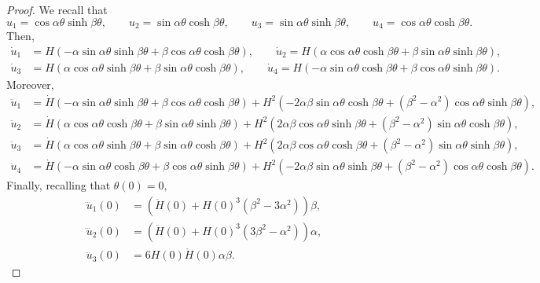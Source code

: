 \documentclass[11pt]{amsart}
\theoremstyle{definition}
\theoremstyle{remark}
\numberwithin{equation}{section}
\begin{document}
\begin{proof}
We recall that
\begin{equation*}
u_1=\cos \alpha\theta\sinh\beta\theta,\qquad
u_2=\sin \alpha\theta\cosh\beta\theta,\qquad
u_3= \sin \alpha\theta\sinh\beta\theta,\qquad
u_4=\cos \alpha\theta\cosh\beta\theta.
\end{equation*}
Then,
\begin{align*}
\dot u_1&=H\left(-\alpha\sin\alpha\theta\sinh\beta\theta+\beta\cos\alpha\theta\cosh\beta\theta\right),\qquad\dot u_2=H\left(\alpha\cos\alpha\theta\cosh\beta\theta+\beta\sin\alpha\theta\sinh\beta\theta\right),\\
\dot u_3&=H\left(\alpha\cos\alpha\theta\sinh\beta\theta+\beta\sin\alpha\theta\cosh\beta\theta\right),\qquad\dot u_4=H\left(-\alpha\sin\alpha\theta\cosh\beta\theta+\beta\cos\alpha\theta\sinh\beta\theta\right).
\end{align*}
Moreover,
\begin{align*}
\ddot u_1&=\dot H\left(-\alpha\sin\alpha\theta\sinh\beta\theta+\beta\cos\alpha\theta\cosh\beta\theta\right)+H^2\left(-2\alpha\beta\sin\alpha\theta\cosh\beta\theta+\left(\beta^2-\alpha^2\right)\cos\alpha\theta\sinh\beta\theta\right),\\
\ddot u_2&=\dot H\left(\alpha\cos\alpha\theta\cosh\beta\theta+\beta\sin\alpha\theta\sinh\beta\theta\right)+H^2\left(2\alpha\beta\cos\alpha\theta\sinh\beta\theta+\left(\beta^2-\alpha^2\right)\sin\alpha\theta\cosh\beta\theta\right),\\
\ddot u_3&=\dot H\left(\alpha\cos\alpha\theta\sinh\beta\theta+\beta\sin\alpha\theta\cosh\beta\theta\right)+H^2\left(2\alpha\beta\cos\alpha\theta\cosh\beta\theta+\left(\beta^2-\alpha^2\right)\sin\alpha\theta\sinh\beta\theta\right),\\
\ddot u_4&=\dot H\left(-\alpha\sin\alpha\theta\cosh\beta\theta+\beta\cos\alpha\theta\sinh\beta\theta\right)+H^2\left(-2\alpha\beta\sin\alpha\theta\sinh\beta\theta+\left(\beta^2-\alpha^2\right)\cos\alpha\theta\cosh\beta\theta\right).
\end{align*}
Finally, recalling that $\theta(0)=0,$
\begin{align*}
\dddot u_1(0)&=\left(\ddot H(0)+H(0)^3\left(\beta^2-3\alpha^2\right)\right)\beta,\\ \dddot u_2(0)&=\left(\ddot H(0)+H(0)^3\left(3\beta^2-\alpha^2\right)\right)\alpha,\\  \dddot u_3(0)&=6H(0)\dot H(0)\alpha\beta.

\end{align*}
\end{proof}
\end{document}
